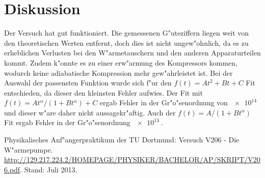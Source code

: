 \section{Diskussion}
\label{sec:diskussion}

Der Versuch hat gut funktioniert. Die gemessenen G"uteziffern liegen weit von den theoretischen Werten entfernt, doch dies ist nicht ungew"ohnlich, da es zu erheblichen Verlusten bei den W"armetauschern und den anderen Apparaturteilen kommt. Zudem k"onnte es zu einer erw"armung des Kompressors kommen, wodurch keine adiabatische Kompression mehr gew"ahrleistet ist.
Bei der Auswahl der passensten Funktion wurde sich f"ur den $f(t)=At^2+Bt+C$ Fit entschieden, da dieser den kleinsten Fehler aufwies. Der Fit mit $f(t) = At^\alpha / (1+Bt^\alpha) + C$ ergab Fehler in der Gr"o"senordnung von $\SI{e14}{}$ und dieser w"are daher nicht aussagekr"aftig. Auch der $f(t) = A/(1+Bt^\alpha)$ Fit ergab Fehler in der Gr"o"senordnung $\SI{e13}{}$.

\begin{thebibliography}{9}
	 Physikalisches Anf"angerpraktikum der TU Dortmund: Versuch V206 - Die W"armepumpe. \url{http://129.217.224.2/HOMEPAGE/PHYSIKER/BACHELOR/AP/SKRIPT/V206.pdf}. Stand: Juli 2013.
\end{thebibliography}